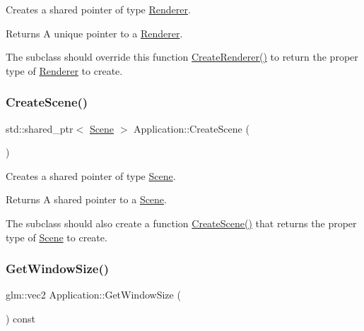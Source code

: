 Creates a shared pointer of type \hyperlink{class_renderer}{Renderer}. 

\begin{DoxyReturn}{Returns}
A unique pointer to a \hyperlink{class_renderer}{Renderer}.
\end{DoxyReturn}
The subclass should override this function \hyperlink{class_application_a90c7fd9ecb6c8923948078903d442919}{Create\+Renderer()} to return the proper type of \hyperlink{class_renderer}{Renderer} to create. \hypertarget{class_application_a511e638cf5748e10151f17d6140b9119}{}\label{class_application_a511e638cf5748e10151f17d6140b9119} 
\subsubsection{\texorpdfstring{Create\+Scene()}{CreateScene()}}
{\footnotesize\ttfamily std\+::shared\+\_\+ptr$<$ \hyperlink{class_scene}{Scene} $>$ Application\+::\+Create\+Scene (\begin{DoxyParamCaption}{ }\end{DoxyParamCaption})\hspace{0.3cm}{\ttfamily [static]}}



Creates a shared pointer of type \hyperlink{class_scene}{Scene}. 

\begin{DoxyReturn}{Returns}
A shared pointer to a \hyperlink{class_scene}{Scene}.
\end{DoxyReturn}
The subclass should also create a function \hyperlink{class_application_a511e638cf5748e10151f17d6140b9119}{Create\+Scene()} that returns the proper type of \hyperlink{class_scene}{Scene} to create. \hypertarget{class_application_ab190ae0e987fe95682714dd4b2495e82}{}\label{class_application_ab190ae0e987fe95682714dd4b2495e82} 
\subsubsection{\texorpdfstring{Get\+Window\+Size()}{GetWindowSize()}}
{\footnotesize\ttfamily glm\+::vec2 Application\+::\+Get\+Window\+Size (\begin{DoxyParamCaption}{ }\end{DoxyParamCaption}) const\hspace{0.3cm}{\ttfamily [virtual]}}



